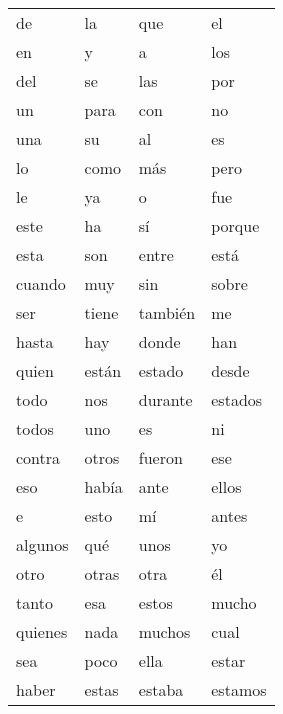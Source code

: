
\begin{table}

\begin{tabular}{l l l l}
	 de  &         
	 la   &        
	 que   &     
	 el     \\    
	 en  &
	 y    &     
	 a     &         
	 los \\  
	 del    &   
	 se     &
	 las     &	   
	 por  \\     
	 un     & 
	 para    &    
	 con      &   
	 no        \\  
	 una    &     
	 su      &       
	 al      &    
	 es      \\  
	 lo      &     
	 como  &
	 m\'as  &     
	 pero    \\     

	 le  &       
	 ya   &     
	 o     &  
	   fue  \\    
	 este    &       
	   ha    &  
	 s\'i    &       
	 porque   \\      
	 esta      & 
	   son   &
	 entre    &   
	   est\'a  \\ 
	 cuando     &   
	 muy        &
	 sin        &  
	 sobre  \\   
	   ser   &
	   tiene  &  
	 tambi\'en &   
	 me         \\  
	 hasta      &
	 hay         &
	 donde    & 
  	 han      \\ 
	 quien     &
	   est\'an  &  
	   estado    &
	 desde     \\
	 todo       &
	 nos       &
	 durante  &
	   estados \\   
	 todos      &
	 uno & 
	 es   &
	 ni   \\      
	 contra &     
	 otros   &  
	   fueron &
	 ese       \\    
	 eso         &  
	   hab\'ia    & 
	 ante        &
	 ellos        \\
	 e           &
	 esto         &  
	 m\'i          & 
	 antes     \\
	 algunos     & 
	 qu\'e      &
	 unos        &
	 yo      \\
	 otro    &
	 otras    &   
	 otra      &    
	 \'el       \\   
	 tanto        &
	 esa          &
	 estos         & 
	 mucho     \\
	 quienes &
	 nada     &   
	 muchos    & 
	 cual       \\   
 	  sea      &
	 poco      &
	 ella      &
	 estar   \\
 	  haber &
	 estas   &     
	   estaba &  
	   estamos \\  

\end{tabular}
\end{table}
